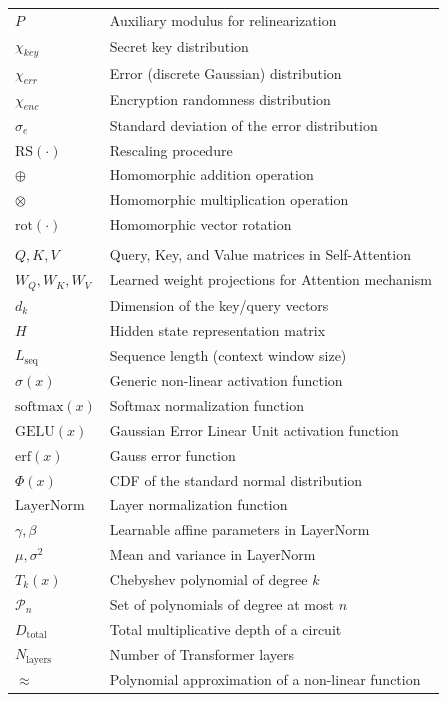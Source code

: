 \begin{longtable}{@{}p{3.5cm}p{11cm}@{}}
$P$                  & Auxiliary modulus for relinearization \\
$\chi_{\mathit{key}}$  & Secret key distribution \\
$\chi_{\mathit{err}}$  & Error (discrete Gaussian) distribution \\
$\chi_{\mathit{enc}}$  & Encryption randomness distribution \\
$\sigma_e$           & Standard deviation of the error distribution \\
$\mathrm{RS}(\cdot)$  & Rescaling procedure \\
$\oplus$             & Homomorphic addition operation \\
$\otimes$            & Homomorphic multiplication operation \\
$\text{rot}(\cdot)$  & Homomorphic vector rotation \\

\vspace{0.5cm} & \vspace{0.5cm} \\ %

$Q, K, V$            & Query, Key, and Value matrices in Self-Attention \\
$W_Q, W_K, W_V$      & Learned weight projections for Attention mechanism \\
$d_k$                & Dimension of the key/query vectors \\
$H$                  & Hidden state representation matrix \\
$L_{\text{seq}}$     & Sequence length (context window size) \\
$\sigma(x)$          & Generic non-linear activation function \\
$\text{softmax}(x)$  & Softmax normalization function \\
$\text{GELU}(x)$     & Gaussian Error Linear Unit activation function \\
$\mathrm{erf}(x)$    & Gauss error function \\
$\Phi(x)$            & CDF of the standard normal distribution \\
$\mathrm{LayerNorm}$  & Layer normalization function \\
$\gamma, \beta$       & Learnable affine parameters in LayerNorm \\
$\mu, \sigma^2$       & Mean and variance in LayerNorm \\
$T_k(x)$             & Chebyshev polynomial of degree $k$ \\
$\mathcal{P}_n$      & Set of polynomials of degree at most $n$ \\
$D_{\text{total}}$    & Total multiplicative depth of a circuit \\
$N_{\text{layers}}$   & Number of Transformer layers \\
$\approx$            & Polynomial approximation of a non-linear function \\


\end{longtable}
